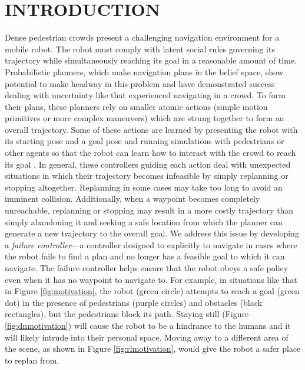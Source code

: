 \documentclass[letterpaper, 10 pt, conference]{ieeeconf}  %
\begin{document}
\section{INTRODUCTION}
	Dense pedestrian crowds present a challenging navigation environment for a mobile robot. The robot must comply with latent social rules governing its trajectory while simultaneously reaching its goal in a reasonable amount of time. Probabilistic planners, which make navigation plans in the belief space, show potential to make headway in this problem and have demonstrated success dealing with uncertainty \cite{ppcp} like that experienced navigating in a crowd. To form their plans, these planners rely on smaller atomic actions (simple motion primitives or more complex maneuvers) which are strung together to form an overall trajectory. Some of these actions are learned by presenting the robot with its starting pose and a goal pose and running simulations with pedestrians or other agents so that the robot can learn how to interact with the crowd to reach its goal \cite{crowdawarerl}. In general, these controllers guiding each action deal with unexpected situations in which their trajectory becomes infeasible by simply replanning or stopping altogether. Replanning in some cases may take too long to avoid an imminent collision. Additionally, when a waypoint becomes completely unreachable, replanning or stopping may result in a more costly trajectory than simply abandoning it and seeking a safe location from which the planner can generate a new trajectory to the overall goal. We address this issue by developing a \textit{failure controller}---a controller designed to explicitly to navigate in cases where the robot fails to find a plan and no longer has a feasible goal to which it can navigate. The failure controller helps ensure that the robot obeys a safe policy even when it has no waypoint to navigate to. For example, in situations like that in Figure \ref{fig:motivation}, the robot (green circle) attempts to reach a goal (green dot) in the presence of pedestrians (purple circles) and obstacles (black rectangles), but the pedestrians block its path. Staying still (Figure \ref{fig:dnmotivation}) will cause the robot to be a hindrance to the humans and it will likely intrude into their personal space. Moving away to a different area of the scene, as shown in Figure \ref{fig:rlmotivation}, would give the robot a safer place to replan from.
	
\end{document}
